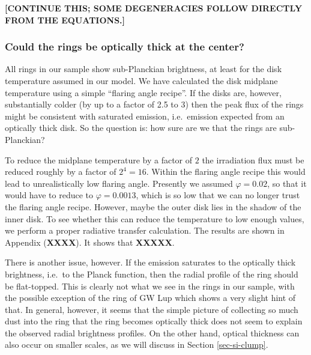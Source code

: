 \documentclass{aa}
\begin{document}
{\bf [CONTINUE THIS; SOME DEGENERACIES FOLLOW DIRECTLY FROM THE EQUATIONS.]}


%
%
%
%
%
%
%





\subsubsection{Could the rings be optically thick at the center?}
\label{sec-anmodel-fits-optically-thick}
%
All rings in our sample show sub-Planckian brightness, at least for the disk
temperature assumed in our model. We have calculated the disk midplane temperature
using a simple ``flaring angle recipe''. If the disks are, however, substantially
colder (by up to a factor of 2.5 to 3) then the peak flux of the rings might be
consistent with saturated emission, i.e.\ emission expected from an optically thick
disk. So the question is: how sure are we that the rings are sub-Planckian? 

To reduce the midplane temperature by a factor of $2$ the irradiation flux must
be reduced roughly by a factor of $2^4=16$. Within the flaring angle recipe this
would lead to unrealistically low flaring angle. Presently we assumed $\varphi=0.02$,
so that it would have to reduce to $\varphi=0.0013$, which is so low that we can no
longer trust the flaring angle recipe. However, maybe the outer disk lies in the
shadow of the inner disk. To see whether this can reduce the temperature to low
enough values, we perform a proper radiative transfer calculation. The results are
shown in Appendix ({\bf XXXX}). It shows that {\bf XXXXX}.

There is another issue, however. If the emission saturates to the optically thick
brightness, i.e.\ to the Planck function, then the radial profile of the ring should
be flat-topped. This is clearly not what we see in the rings in our sample, with
the possible exception of the ring of GW Lup which shows a very slight hint of that.
In general, however, it seems that the simple picture of collecting so much dust into
the ring that the ring becomes optically thick does not seem to explain the observed
radial brightness profiles. On the other hand, optical thickness can also occur
on smaller scales, as we will discuss in Section \ref{sec-si-clump}.
\end{document}
